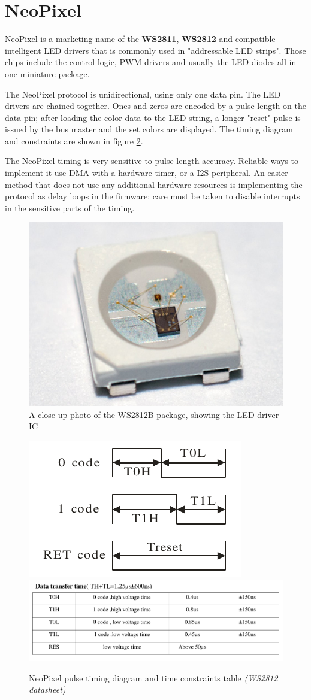 \section{NeoPixel}

NeoPixel is a marketing name of the \textbf{WS2811}, \textbf{WS2812} and compatible intelligent LED drivers that is commonly used in "addressable LED strips". Those chips include the control logic, PWM drivers and usually the LED diodes all in one miniature package.

The NeoPixel protocol is unidirectional, using only one data pin. The LED drivers are chained together. Ones and zeros are encoded by a pulse length on the data pin; after loading the color data to the LED string, a longer "reset" pulse is issued by the bus master and the set colors are displayed. The timing diagram and constraints are shown in figure \ref{fig:ws2812-dia}.

The NeoPixel timing is very sensitive to pulse length accuracy. Reliable ways to implement it use DMA with a hardware timer, or a I2S peripheral. An easier method that does not use any additional hardware resources is implementing the protocol as delay loops in the firmware; care must be taken to disable interrupts in the sensitive parts of the timing.

\begin{figure}
	\centering
	\includegraphics[width=.6\textwidth] {img/ws2812b-detail.jpg}
	\caption{\label{fig:ws2812-detail}A close-up photo of the WS2812B package, showing the LED driver IC}
\end{figure}

\begin{figure}
	\centering
	\includegraphics[width=.4\textwidth] {img/neo-diagram.png}
	\includegraphics[width=\textwidth] {img/neo-lengths.png}
	\caption{\label{fig:ws2812-dia}NeoPixel pulse timing diagram and time constraints table \textit{(WS2812 datasheet)}}
\end{figure}
